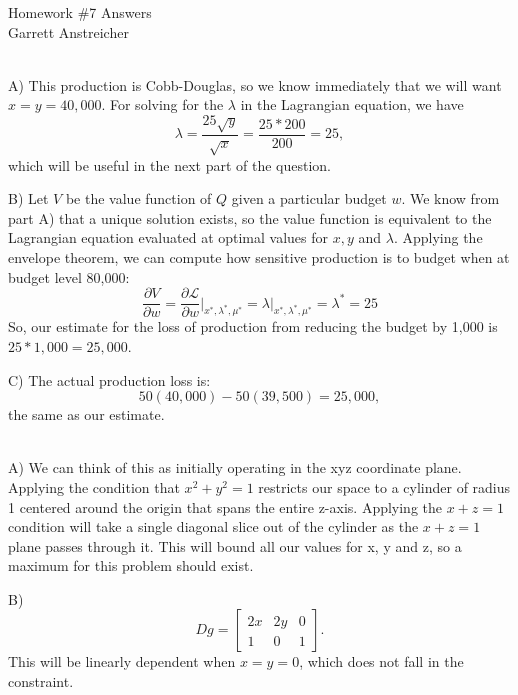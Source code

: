 \documentclass[12pt,leqno]{article}
\newcommand{\lgrange}{\mathscr{L}}
\begin{document}
\begin{center}
\Large{Homework {\#}7 Answers}\\
\large{Garrett Anstreicher}
\end{center}

\bigskip
{}\\
\indent A) This production is Cobb-Douglas, so we know immediately that we will want $x = y = 40,000$. For solving for the $\lambda$ in the Lagrangian equation, we have
$$\lambda = \frac{25\sqrt{y}}{\sqrt{x}} = \frac{25*200}{200} = 25,$$
which will be useful in the next part of the question.

\bigskip
\indent B) Let $V$ be the value function of $Q$ given a particular budget $w$. We know from part A) that a unique solution exists, so the value function is equivalent to the Lagrangian equation evaluated at optimal values for $x, y$ and $\lambda$. Applying the envelope theorem, we can compute how sensitive production is to budget when at budget level 80,000:
$$\frac{\partial V}{\partial w} = \frac{\partial \lgrange}{\partial w}\rvert_{x^*, \lambda^*, \mu^*} = \lambda \rvert_{x^*, \lambda^*, \mu^*} = \lambda^* = 25$$
So, our estimate for the loss of production from reducing the budget by 1,000 is $25*1,000 = 25,000$. 

\bigskip
\indent C) The actual production loss is:
$$50(40,000) - 50(39,500) = 25,000,$$
the same as our estimate. 

\bigskip
{}\\
\indent A) We can think of this as initially operating in the xyz coordinate plane. Applying the condition that $x^2+y^2 = 1$ restricts our space to a cylinder of radius 1 centered around the origin that spans the entire z-axis. Applying the $x + z = 1$ condition will take a single diagonal slice out of the cylinder as the $x + z = 1$ plane passes through it. This will bound all our values for x, y and z, so a maximum for this problem should exist.

\bigskip
\indent B) 
$$Dg = \begin{bmatrix}
	2x & 2y & 0 \\
	1 & 0 & 1
\end{bmatrix}.$$
This will be linearly dependent when $x = y = 0$, which does not fall in the constraint.
\end{document}
